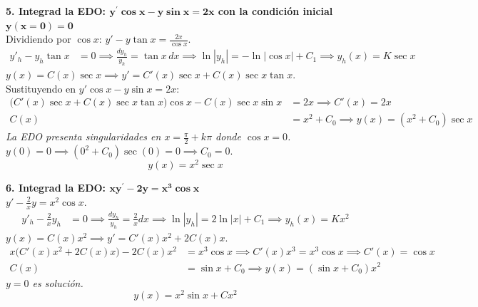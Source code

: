 \documentclass[11pt, a4paper]{article}
\begin{document}
\noindent\textbf{5. Integrad la EDO: $\bm{y^{\prime}\cos x-y\sin x=2x}$ con la condición inicial $\bm{y(x=0)=0}$} \\
Dividiendo por $\cos x$: $y' - y\tan x = \frac{2x}{\cos x}$. \\
\begin{align*}
y'_h - y_h\tan x &= 0 \implies \frac{dy_h}{y_h} = \tan x\,dx \implies \ln|y_h| = -\ln|\cos x| + C_1 \implies y_h(x) = K\sec x
\end{align*}
$y(x) = C(x)\sec x \implies y' = C'(x)\sec x + C(x)\sec x\tan x$. \\
Sustituyendo en $y'\cos x - y\sin x = 2x$:
\begin{align*}
\big(C'(x)\sec x + C(x)\sec x\tan x\big)\cos x - C(x)\sec x\sin x &= 2x \implies C'(x) = 2x \\
C(x) &= x^2 + C_0 \implies y(x) = (x^2 + C_0)\sec x
\end{align*}
\textit{La EDO presenta singularidades en $x = \frac{\pi}{2} + k\pi$ donde $\cos x = 0$.} \\
$y(0)=0 \implies (0^2 + C_0)\sec(0) = 0 \implies C_0 = 0$.
\[
\boxed{y(x) = x^2 \sec x}
\]


\noindent\textbf{6. Integrad la EDO: $\bm{xy^{\prime}-2y=x^{3}\cos x}$} \\
$y' - \frac{2}{x}y = x^2 \cos x$. \\
\begin{align*}
y'_h - \frac{2}{x}y_h &= 0 \implies \frac{dy_h}{y_h} = \frac{2}{x}dx \implies \ln|y_h| = 2\ln|x| + C_1 \implies y_h(x) = Kx^2
\end{align*}
$y(x) = C(x)x^2 \implies y' = C'(x)x^2 + 2C(x)x$. \\
\begin{align*}
x\big(C'(x)x^2 + 2C(x)x\big) - 2C(x)x^2 &= x^3 \cos x \implies C'(x)x^3 = x^3 \cos x \implies C'(x) = \cos x \\
C(x) &= \sin x + C_0 \implies y(x) = (\sin x + C_0)x^2
\end{align*}
\textit{$y=0$ es solución.}
\[
\boxed{y(x) = x^2 \sin x + C x^2}
\]
\end{document}
